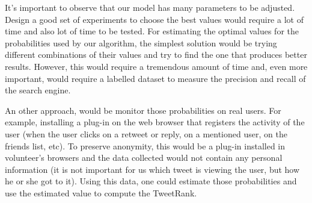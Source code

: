 It's important to observe that our model has many parameters to be adjusted. Design a good set of experiments to choose the best values would require a lot of time and also lot of time to be tested. For estimating the optimal values for the probabilities used by our algorithm, the simplest solution would be trying different combinations of their values and try to find the one that produces better results. However, this would require a tremendous amount of time and, even more important, would require a labelled dataset to measure the precision and recall of the search engine.

An other approach, would be monitor those probabilities on real users. For example, installing a plug-in on the web browser that registers the activity of the user (when the user clicks on a retweet or reply, on a mentioned user, on the friends list, etc). To preserve anonymity, this would be a plug-in installed in volunteer's browsers and the data collected would not contain any personal information (it is not important for us which tweet is viewing the user, but how he or she got to it). Using this data, one could estimate those probabilities and use the estimated value to compute the TweetRank.